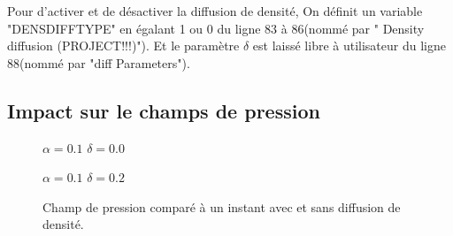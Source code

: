 \documentclass{article}
\begin{document}
Pour d'activer et de désactiver la diffusion de densité, On définit un variable "DENSDIFFTYPE" en égalant 1 ou 0 du ligne 83 à 86(nommé par " Density diffusion (PROJECT!!!)"). Et le paramètre $\delta$ est laissé libre à utilisateur du ligne 88(nommé par "diff Parameters").\par
  
\subsection{Impact sur le champs de pression}
\begin{figure}[h]
	\begin{minipage}[h]{0.49\linewidth}
		{$\alpha=0.1$ $\delta=0.0$}
	\end{minipage}
	\hfill
	\begin{minipage}[h]{0.49\linewidth}
		{$\alpha=0.1$ $\delta=0.2$}
	\end{minipage}
	\caption{Champ de pression comparé à un instant avec et sans diffusion de densité.}
\end{figure}
\end{document}
